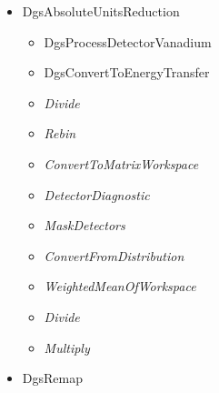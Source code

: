 \begin{itemize}
\item DgsAbsoluteUnitsReduction
\begin{itemize}
\item DgsProcessDetectorVanadium
\item DgsConvertToEnergyTransfer
\item \textit{Divide}
\item \textit{Rebin}
\item \textit{ConvertToMatrixWorkspace}
\item \textit{DetectorDiagnostic}
\item \textit{MaskDetectors}
\item \textit{ConvertFromDistribution}
\item \textit{WeightedMeanOfWorkspace}
\item \textit{Divide}
\item \textit{Multiply}
\end{itemize}
\end{itemize}

\begin{itemize}
\item DgsRemap
\end{itemize}